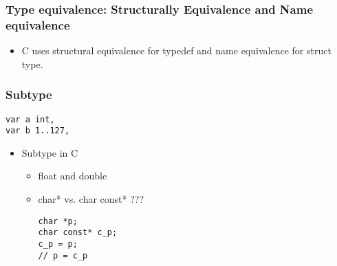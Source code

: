 \documentclass[11pt]{article}
\begin{document}
\subsubsection{Type equivalence: Structurally Equivalence and Name equivalence}
\label{sec:orgd86577b}
\begin{itemize}
\item C uses structural equivalence for typedef and name equivalence for struct
type.
\end{itemize}

\subsubsection{Subtype}
\label{sec:org5bcbfd8}
\begin{verbatim}
var a int,
var b 1..127,
\end{verbatim}
\begin{itemize}
\item Subtype in C
\begin{itemize}
\item float and double
\item char* vs. char const* ???
\begin{verbatim}
char *p;
char const* c_p;
c_p = p;
// p = c_p
\end{verbatim}
\end{itemize}
\end{itemize}
\end{document}
